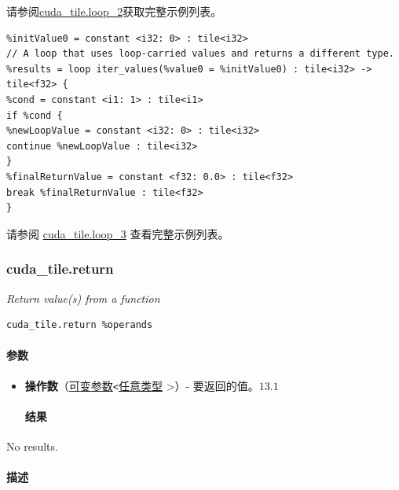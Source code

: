 \documentclass{article}
\begin{document}
请参阅\href{https://docs.nvidia.com/cuda/tile-ir/latest/sections/appendix.html#example-cuda-tile-loop-2}{cuda\_tile.loop\_2}获取完整示例列表。


\begin{lstlisting}
%initValue0 = constant <i32: 0> : tile<i32>
// A loop that uses loop-carried values and returns a different type.
%results = loop iter_values(%value0 = %initValue0) : tile<i32> -> tile<f32> {
%cond = constant <i1: 1> : tile<i1>
if %cond {
%newLoopValue = constant <i32: 0> : tile<i32>
continue %newLoopValue : tile<i32>
}
%finalReturnValue = constant <f32: 0.0> : tile<f32>
break %finalReturnValue : tile<f32>
}
\end{lstlisting}

请参阅 \href{https://docs.nvidia.com/cuda/tile-ir/latest/sections/appendix.html#example-cuda-tile-loop-3}{cuda\_tile.loop\_3} 查看完整示例列表。



\subsubsection{cuda\_tile.return}

\textit{Return value(s) from a function}


\begin{lstlisting}
cuda_tile.return %operands
\end{lstlisting}

\paragraph{参数}

\begin{itemize}
\item \textbf{操作数}（\href{https://docs.nvidia.com/cuda/tile-ir/latest/sections/operations.html#type-variadic}{可变参数}\texttt{<}\href{https://docs.nvidia.com/cuda/tile-ir/latest/sections/operations.html#type-any}{任意类型} >）- 要返回的值。$\boxed{13.1}$


\paragraph{结果}

\end{itemize}
No results.



\paragraph{描述}
\end{document}
